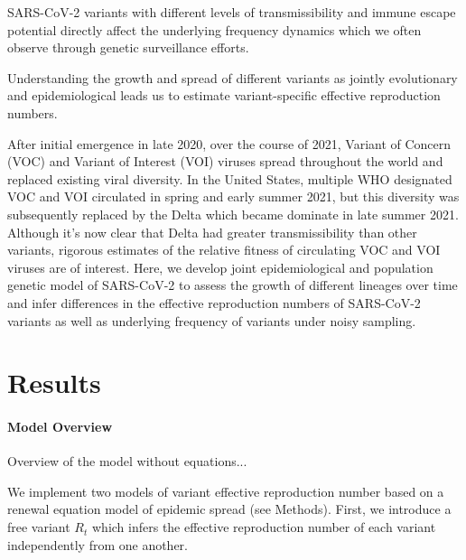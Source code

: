 \documentclass[11pt,oneside,letterpaper]{article}
\begin{document}
SARS-CoV-2 variants with different levels of transmissibility and immune escape potential directly affect the underlying frequency dynamics which we often observe through genetic surveillance efforts.

Understanding the growth and spread of different variants as jointly evolutionary and epidemiological leads us to estimate variant-specific effective reproduction numbers.



After initial emergence in late 2020, over the course of 2021, Variant of Concern (VOC) and Variant of Interest (VOI) viruses spread throughout the world and replaced existing viral diversity.
In the United States, multiple WHO designated \cite{Konings2021} VOC and VOI circulated in spring and early summer 2021, but this diversity was subsequently replaced by the Delta which became dominate in late summer 2021.
Although it's now clear that Delta had greater transmissibility than other variants, rigorous estimates of the relative fitness of circulating VOC and VOI viruses are of interest.
Here, we develop joint epidemiological and population genetic model of SARS-CoV-2 to assess the growth of different lineages over time and infer differences in the effective reproduction numbers of SARS-CoV-2 variants as well as underlying frequency of variants under noisy sampling.

\section*{Results}


\paragraph{Model Overview}

Overview of the model without equations...

We implement two models of variant effective reproduction number based on a renewal equation model of epidemic spread (see Methods).
First, we introduce a free variant $R_{t}$ which infers the effective reproduction number of each variant independently from one another.
\end{document}
